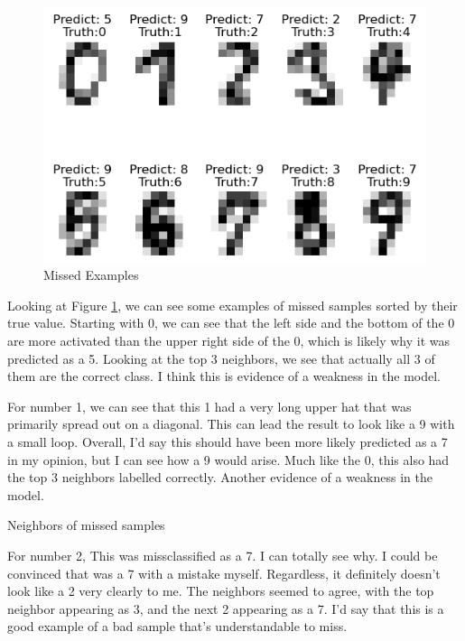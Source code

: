 \documentclass[12pt]{article}
\begin{document}
\begin{figure}
  \includegraphics[width = \textwidth]{../results5/Digits_Missed.png}
  \caption{Missed Examples}
  \label{figure8}
\end{figure}

Looking at Figure \ref{figure8}, we can see some examples of missed samples sorted by their true value. Starting with 0, 
we can see that the left side and the bottom of the 0 are more activated than the upper right side of the 0, which is likely 
why it was predicted as a 5. Looking at the top 3 neighbors, we see that actually all 3 of them are the correct class. 
I think this is evidence of a weakness in the model.

For number 1, we can see that this 1 had a very long upper hat that was primarily spread out on a diagonal. This can 
lead the result to look like a 9 with a small loop. Overall, I'd say this should have been more likely predicted as a
7 in my opinion, but I can see how a 9 would arise. Much like the 0, this also had the top 3 neighbors labelled correctly.
Another evidence of a weakness in the model.


\begin{table}
  \resizebox*{\textwidth}{!}{}
  \caption{Neighbors of missed samples}
  \label{table3}
\end{table}

For number 2, This was missclassified as a 7. I can totally see why. I could be convinced that was a 7 with a mistake myself.
Regardless, it definitely doesn't look like a 2 very clearly to me. The neighbors seemed to agree, with the top neighbor 
appearing as 3, and the next 2 appearing as a 7. I'd say that this is a good example of a bad sample that's understandable to miss.
\end{document}
